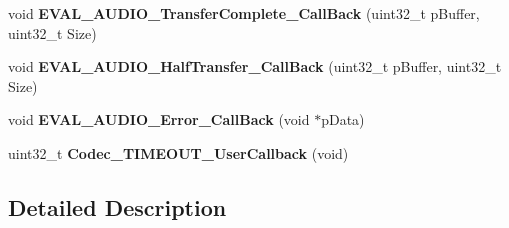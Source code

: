 \begin{DoxyCompactItemize}
\item 
\hypertarget{group___s_t_m32_f4___d_i_s_c_o_v_e_r_y___a_u_d_i_o___c_o_d_e_c___exported___functions_ga020b90d50e29c81842d4334a910a4edc}{void {\bfseries E\-V\-A\-L\-\_\-\-A\-U\-D\-I\-O\-\_\-\-Transfer\-Complete\-\_\-\-Call\-Back} (uint32\-\_\-t p\-Buffer, uint32\-\_\-t Size)}\label{group___s_t_m32_f4___d_i_s_c_o_v_e_r_y___a_u_d_i_o___c_o_d_e_c___exported___functions_ga020b90d50e29c81842d4334a910a4edc}

\item 
\hypertarget{group___s_t_m32_f4___d_i_s_c_o_v_e_r_y___a_u_d_i_o___c_o_d_e_c___exported___functions_ga5ea18d6e774ac0e724c8684ef13b5589}{void {\bfseries E\-V\-A\-L\-\_\-\-A\-U\-D\-I\-O\-\_\-\-Half\-Transfer\-\_\-\-Call\-Back} (uint32\-\_\-t p\-Buffer, uint32\-\_\-t Size)}\label{group___s_t_m32_f4___d_i_s_c_o_v_e_r_y___a_u_d_i_o___c_o_d_e_c___exported___functions_ga5ea18d6e774ac0e724c8684ef13b5589}

\item 
\hypertarget{group___s_t_m32_f4___d_i_s_c_o_v_e_r_y___a_u_d_i_o___c_o_d_e_c___exported___functions_gaa5e3541996c8e0b552ff2379e9a7c6d3}{void {\bfseries E\-V\-A\-L\-\_\-\-A\-U\-D\-I\-O\-\_\-\-Error\-\_\-\-Call\-Back} (void $\ast$p\-Data)}\label{group___s_t_m32_f4___d_i_s_c_o_v_e_r_y___a_u_d_i_o___c_o_d_e_c___exported___functions_gaa5e3541996c8e0b552ff2379e9a7c6d3}

\item 
\hypertarget{group___s_t_m32_f4___d_i_s_c_o_v_e_r_y___a_u_d_i_o___c_o_d_e_c___exported___functions_gacc456a5ec7076feff5b6e816923088bc}{uint32\-\_\-t {\bfseries Codec\-\_\-\-T\-I\-M\-E\-O\-U\-T\-\_\-\-User\-Callback} (void)}\label{group___s_t_m32_f4___d_i_s_c_o_v_e_r_y___a_u_d_i_o___c_o_d_e_c___exported___functions_gacc456a5ec7076feff5b6e816923088bc}

\end{DoxyCompactItemize}


\subsection{Detailed Description}


